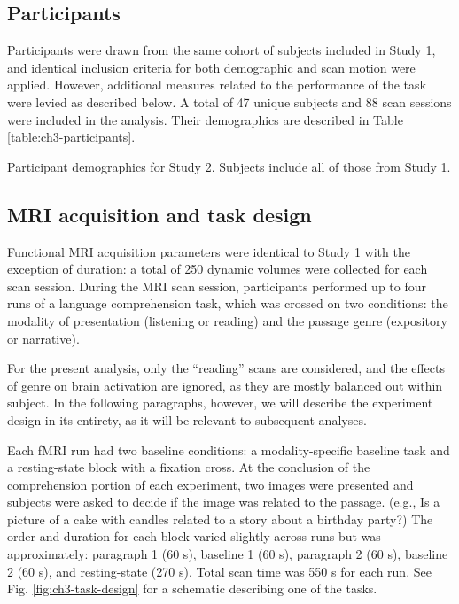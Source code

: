 \subsection{Participants}

Participants were drawn from the same cohort of subjects included in Study 1, and identical inclusion criteria for both demographic and scan motion were applied. However, additional measures related to the performance of the task were levied as described below. A total of 47 unique subjects and 88 scan sessions were included in the analysis. Their demographics are described in Table \ref{table:ch3-participants}.

\begin{table}
	\renewcommand{\tabcolsep}{0.09cm}
	\centering
	
	\caption[Participant demographics for Study 2.]{Participant demographics for Study 2. Subjects include all of those from Study 1.}
	\label{table:ch3-participants}
\end{table}


\subsection{MRI acquisition and task design}

Functional MRI acquisition parameters were identical to Study 1 with the exception of duration: a total of 250 dynamic volumes were collected for each scan session. During the MRI scan session, participants performed up to four runs of a language comprehension task, which was crossed on two conditions: the modality of presentation (listening or reading) and the passage genre (expository or narrative).  

For the present analysis, only the ``reading'' scans are considered, and the effects of genre on brain activation are ignored, as they are mostly balanced out within subject. In the following paragraphs, however, we will describe the experiment design in its entirety, as it will be relevant to subsequent analyses.

Each fMRI run had two baseline conditions: a modality-specific baseline task and a resting-state block with a fixation cross. At the conclusion of the comprehension portion of each experiment, two images were presented and subjects were asked to decide if the image was related to the passage. (e.g., Is a picture of a cake with candles related to a story about a birthday party?) The order and duration for each block varied slightly across runs but was approximately: paragraph 1 (60 s), baseline 1 (60 s), paragraph 2 (60 s), baseline 2 (60 s), and resting-state (270 s). Total scan time was 550 s for each run. See Fig. \ref{fig:ch3-task-design} for a schematic describing one of the tasks.

